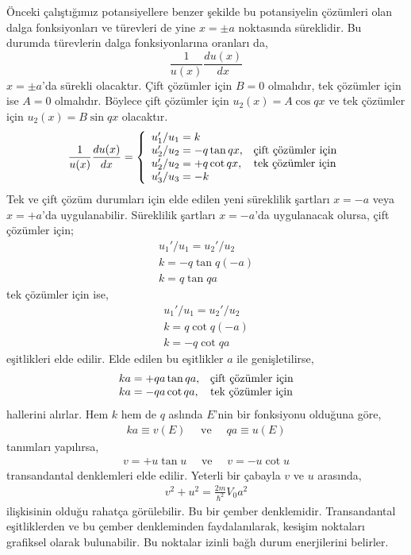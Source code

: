 \documentclass[00_kitap.tex]{subfiles}
\begin{document}
Önceki çalıştığımız potansiyellere benzer şekilde bu potansiyelin çözümleri olan dalga fonksiyonları ve türevleri de yine $x=\pm a$ noktasında süreklidir. Bu durumda türevlerin dalga fonksiyonlarına oranları da,
\begin{equation}
\frac{1}{u(x)} \frac{d u(x)}{d x}
\end{equation}
$x=\pm a$'da sürekli olacaktır. Çift çözümler için $B=0$ olmalıdır, tek çözümler için ise $A=0$ olmalıdır. Böylece çift çözümler için $u_2(x) = A \cos qx$ ve tek çözümler için $u_2(x) = B \sin qx$ olacaktır.
\begin{align}
\frac{1}{u(x)} \frac{d u(x)}{d x} = \left\{ 
\begin{array} { l l } 
{u_1'/u_1 = k } & \\
{u_2'/u_2 = -q\tan qx }, & \text{çift çözümler için}\\
{u_2'/u_2 = +q\cot qx }, & \text{tek çözümler için}\\
{u_3'/u_3 = -k } & 
\end{array} \right. 
\end{align}
Tek ve çift çözüm durumları için elde edilen yeni süreklilik şartları $x=-a$ veya $x=+a$'da uygulanabilir. Süreklilik şartları $x=-a$'da uygulanacak olursa, çift çözümler için;
\begin{align}
u_1'/u_1 = u_2'/u_2 \nonumber\\
k = -q\tan q(-a) \nonumber\\
k = q\tan q a
\end{align}
tek çözümler için ise,
\begin{align}
u_1'/u_1 = u_2'/u_2 \nonumber\\
k = q\cot q(-a) \nonumber\\
k = -q\cot q a
\end{align}
eşitlikleri elde edilir. Elde edilen bu eşitlikler $a$ ile genişletilirse,
\begin{align}
\begin{array} { l l } 
ka = +qa\tan q a, & \text{çift çözümler için}\\
ka = -qa\cot q a, & \text{tek çözümler için}
\end{array}
\end{align}
hallerini alırlar. Hem $k$ hem de $q$ aslında $E$'nin bir fonksiyonu olduğuna göre, 
\begin{align}
ka \equiv v(E) \quad \text{ ve } \quad qa \equiv u(E)
\end{align}
tanımları yapılırsa, 
\begin{align}
v = +u\tan u \quad \text{ ve } \quad v = -u\cot u
\end{align}
transandantal denklemleri elde edilir. Yeterli bir çabayla $v$ ve $u$ arasında,
\begin{align}
v^2 + u^2 = \frac{2 m }{\hbar^{2}} V_0 a^2
\end{align}
ilişkisinin olduğu rahatça görülebilir. Bu bir çember denklemidir. Transandantal eşitliklerden ve bu çember denkleminden faydalanılarak, kesişim noktaları grafiksel olarak bulunabilir. Bu noktalar izinli bağlı durum enerjilerini belirler.
\end{document}
